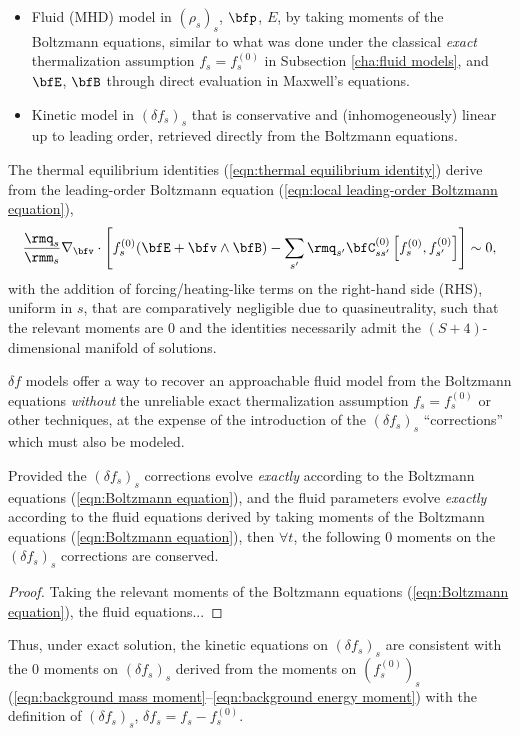 \begin{definition}
        \begin{itemize}
            \item  Fluid (MHD) model in $(\rho_{s})_{s}$, $\bfp$, $E$, by taking moments of the Boltzmann equations, similar to what was done under the classical \emph{exact} thermalization assumption $f_{s}  =  f_{s}^{(0)}$ in Subsection \ref{cha:fluid models}, and $\bfE$, $\bfB$ through direct evaluation in Maxwell's equations.
            \item  Kinetic model in $(\delta\!f_{s})_{s}$ that is conservative and (inhomogeneously) linear up to leading order, retrieved directly from the Boltzmann equations.
        \end{itemize}
    \end{definition}

    The thermal equilibrium identities (\ref{eqn:thermal equilibrium identity}) derive from the leading-order Boltzmann equation (\ref{eqn:local leading-order Boltzmann equation}),
    \begin{equation}
        \frac{\rmq_{s}}{\rmm_{s}}\nabla_{\bfv}\cdot\left[f_{s}^{(0)}(\bfE + \bfv\wedge\bfB) - \sum_{s'}\rmq_{s'}\bfC_{ss'}^{(0)}\left[f_{s}^{(0)}, f_{s'}^{(0)}\right]\right]  \sim  0,
    \end{equation}
    with the addition of forcing/heating-like terms on the right-hand side (RHS), uniform in $s$, that are comparatively negligible due to quasineutrality, such that the relevant moments are 0 and the identities necessarily admit the $(S + 4)$-dimensional manifold of solutions.

    $\delta\!f$ models offer a way to recover an approachable fluid model from the Boltzmann equations \emph{without} the unreliable exact thermalization assumption $f_{s}  =  f_{s}^{(0)}$ or other techniques, at the expense of the introduction of the $(\delta\!f_{s})_{s}$ ``corrections'' which must also be modeled.

    \line

    \begin{lemma}
        Provided the $(\delta\!f_{s})_{s}$ corrections evolve \emph{exactly} according to the Boltzmann equations (\ref{eqn:Boltzmann equation}), and the fluid parameters evolve \emph{exactly} according to the fluid equations derived by taking moments of the Boltzmann equations (\ref{eqn:Boltzmann equation}), then $\forall t$, the following 0 moments on the $(\delta\!f_{s})_{s}$ corrections are conserved.
    \end{lemma}
    \begin{proof}
        Taking the relevant moments of the Boltzmann equations (\ref{eqn:Boltzmann equation}), the fluid equations...
    \end{proof}
    Thus, under exact solution, the kinetic equations on $(\delta\!f_{s})_{s}$ are consistent with the 0 moments on $(\delta\!f_{s})_{s}$ derived from the moments on $(f_{s}^{(0)})_{s}$ (\ref{eqn:background mass moment}--\ref{eqn:background energy moment}) with the definition of $(\delta\!f_{s})_{s}$, $\delta\!f_{s}  =  f_{s} - f_{s}^{(0)}$.

